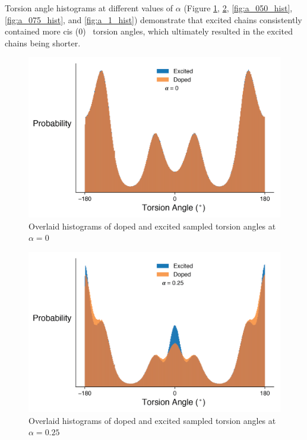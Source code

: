 Torsion angle histograms at different values of $\alpha$ (Figure \ref{fig:a_0_hist}, \ref{fig:a_025_hist}, \ref{fig:a_050_hist}, \ref{fig:a_075_hist}, and \ref{fig:a_1_hist}) demonstrate that excited chains consistently contained more cis (0\textdegree) \ torsion angles, which ultimately resulted in the excited chains being shorter.

\begin{figure}[hbt!]
    \centering
    \includegraphics{figures/append_tor_model/a_0_hist.png}
    \caption[Histogram of Doped and Excited Sampled Torsion Angles at $\alpha = 0$]{Overlaid histograms of doped and excited sampled torsion angles at $\alpha = 0$}
    \label{fig:a_0_hist}
\end{figure}

\begin{figure}[hbt!]
    \centering
    \includegraphics{figures/append_tor_model/a_025_hist.png}
    \caption[Histogram of Doped and Excited Sampled Torsion Angles at $\alpha = 0.25$]{Overlaid histograms of doped and excited sampled torsion angles at $\alpha = 0.25$}
    \label{fig:a_025_hist}
\end{figure}

